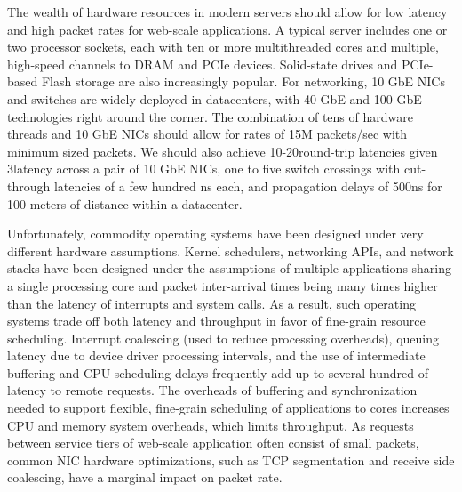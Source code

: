 The wealth of hardware resources in modern servers should allow for
low latency and high packet rates for web-scale applications.  A
typical server includes one or two processor sockets, each with ten or
more multithreaded cores and multiple, high-speed channels to DRAM and
PCIe devices. Solid-state drives and PCIe-based Flash storage are also
increasingly popular. For networking, 10 GbE NICs and switches are
widely deployed in datacenters, with 40 GbE and 100 GbE technologies
right around the corner. The combination of tens of hardware threads
and 10 GbE NICs should allow for rates of 15M packets/sec with minimum
sized packets.  We should also achieve 10-20\microsecond round-trip
latencies given 3\microsecond latency across a pair of 10 GbE NICs,
one to five switch crossings with cut-through latencies of a few
hundred ns each, and propagation delays of 500ns for 100 meters
of distance within a datacenter.


Unfortunately, commodity operating systems have been designed under
very different hardware assumptions. Kernel schedulers, networking
APIs, and network stacks have been designed under the assumptions of
multiple applications sharing a single processing core and packet
inter-arrival times being many times higher than the latency of interrupts
and system calls.  As a result, such operating systems trade off both
latency and throughput in favor of fine-grain resource scheduling.
Interrupt coalescing (used to reduce processing overheads), queuing
latency due to device driver processing intervals, and the use of
intermediate buffering and CPU scheduling delays frequently add up to
several hundred \microsecond of latency to remote requests.  The
overheads of buffering and synchronization needed to support flexible,
fine-grain scheduling of applications to cores increases CPU and
memory system overheads, which limits throughput.  As requests between
service tiers of web-scale application often consist of small packets,
common NIC hardware optimizations, such as TCP segmentation and
receive side coalescing, have a marginal impact on packet rate.



